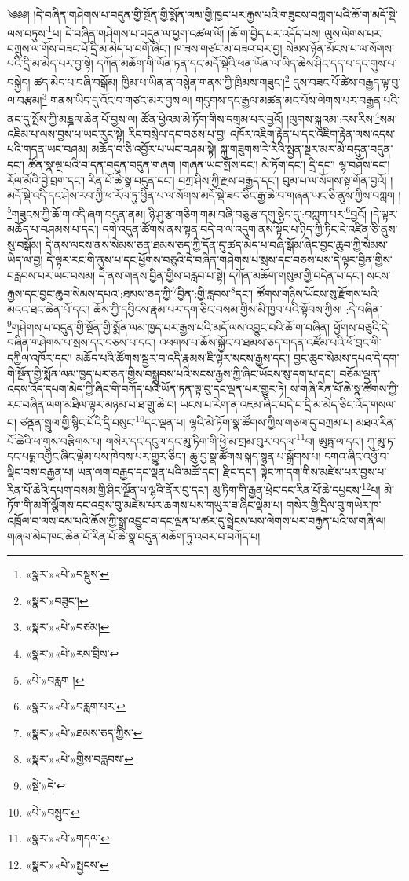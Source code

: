 ༄༅༅། །དེ་བཞིན་གཤེགས་པ་བདུན་གྱི་སྔོན་གྱི་སྨོན་ལམ་གྱི་ཁྱད་པར་རྒྱས་པའི་གཟུངས་བཀླག་པའི་ཆོ་ག་མདོ་སྡེ་ལས་བཏུས་\footnote{«སྣར་»«པེ་»བསྡུས་}པ། དེ་བཞིན་གཤེགས་པ་བདུན་ལ་ཕྱག་འཚལ་ལོ། །ཆོ་ག་བྱེད་པར་འདོད་པས། ལུས་ལེགས་པར་བཀྲུས་ལ་གོས་བཟང་པོ་དྲི་མ་མེད་པ་བགོ་ཞིང་། ཁ་ཟས་གཙང་མ་བཟའ་བར་བྱ། སེམས་ཉོན་མོངས་པ་ལ་སོགས་པའི་དྲི་མ་མེད་པར་བྱ་སྟེ། དཀོན་མཆོག་གི་ཡོན་ཏན་དང་མདོ་སྡེའི་ཕན་ཡོན་ལ་ཡིད་ཆེས་ཤིང་དད་པ་དང་གུས་པ་བསྐྱེད། ཚད་མེད་པ་བཞི་བསྒོམ། ཁྱིམ་པ་ཡིན་ན་བསྙེན་གནས་ཀྱི་ཁྲིམས་གཟུང་།\footnote{«སྣར་»བཟུང་།} དུས་བཟང་པོ་ཚེས་བརྒྱད་ལྟ་བུ་ལ་བརྩམ།\footnote{«སྣར་»«པེ་»བཙམ།} གནས་ཡིད་དུ་འོང་བ་གཙང་མར་བྱས་ལ། གདུགས་དང་རྒྱལ་མཚན་མང་པོས་ལེགས་པར་བརྒྱན་པའི་ནང་དུ་སྤོས་ཀྱི་མཎྜལ་ཆེན་པོ་བྱས་ལ། ཚོན་ཕྱེའམ་མེ་ཏོག་གིས་དགྲམ་པར་བྱའོ། །ལུགས་སྐུའམ་:རས་རིས་\footnote{«སྣར་»«པེ་»རས་བྲིས་}སམ་འཇིམ་པ་ལས་བྱས་པ་ཡང་རུང་སྟེ། རིང་བསྲེལ་དང་བཅས་པ་བྱ། འཁོར་འཇིག་རྟེན་པ་དང་འཇིག་རྟེན་ལས་འདས་པའི་གདན་ཡང་བཤམ། མཆོད་བ་ཅི་འབྱོར་པ་ཡང་བཤམ་སྟེ། སྐུ་གཟུགས་རེ་རེའི་སྤྱན་སྔར་མར་མེ་བདུན་བདུན་དང་། ཚོན་སྣ་ལྔ་པའི་བ་དན་བདུན་བདུན་གཞག །གཞན་ཡང་སྤོས་དང་། མེ་ཏོག་དང་། དྲི་དང་། ལྷ་བཤོས་དང་། རོལ་མོའི་བྱེ་བྲག་དང་། རིན་པོ་ཆེ་སྣ་བདུན་དང་། བཀྲ་ཤིས་ཀྱི་རྫས་བརྒྱད་དང་། བུམ་པ་ལ་སོགས་སྟ་གོན་བྱའོ། །མདོ་སྡེ་འདི་དང་ཤེས་རབ་ཀྱི་ཕ་རོལ་ཏུ་ཕྱིན་པ་ལ་སོགས་མདོ་སྡེ་ཟབ་ཅིང་རྒྱ་ཆེ་བ་གཞན་ཡང་ཅི་ནུས་ཀྱིས་བཀླག །\footnote{«པེ་»བརླག །}གཟུངས་ཀྱི་ཆོ་ག་འདི་ཞག་བདུན་ནམ། ཉི་ཤུ་རྩ་གཅིག་གམ་བཞི་བཅུ་རྩ་དགུ་སྙེད་དུ་:བཀླག་པར་\footnote{«སྣར་»«པེ་»བརླག་པར་}བྱའོ། །དེ་ལྟར་མཆོད་པ་བཤམས་པ་དང་། དགེ་འདུན་ཚོགས་ནས་སྟན་བདེ་བ་ལ་འདུག་ནས་སྟོང་པ་ཉིད་ཀྱི་ཏིང་ངེ་འཛིན་ཅི་ནུས་སུ་བསྒོམ། དེ་ནས་ལངས་ནས་སེམས་ཅན་ཐམས་ཅད་ཀྱི་དོན་དུ་ཚད་མེད་པ་བཞི་སྒོམ་ཞིང་བྱང་ཆུབ་ཀྱི་སེམས་ཡིད་ལ་བྱ། དེ་ལྟར་རང་གི་ནུས་པ་དང་ཕྱོགས་བཅུའི་དེ་བཞིན་གཤེགས་པ་སྲས་དང་བཅས་པས་དེ་ལྟར་བྱིན་གྱིས་བརླབས་པར་ཡང་བསམ། དེ་ནས་གནས་བྱིན་གྱིས་བརླབ་པ་སྟེ། དཀོན་མཆོག་གསུམ་གྱི་བདེན་པ་དང་། སངས་རྒྱས་དང་བྱང་ཆུབ་སེམས་དཔའ་:ཐམས་ཅད་ཀྱི་\footnote{«སྣར་»«པེ་»ཐམས་ཅད་ཀྱིས་}བྱིན་:གྱི་རླབས་\footnote{«སྣར་»«པེ་»གྱིས་བརླབས་}དང་། ཚོགས་གཉིས་ཡོངས་སུ་རྫོགས་པའི་མངའ་ཐང་ཆེན་པོ་དང་། ཆོས་ཀྱི་དབྱིངས་རྣམ་པར་དག་ཅིང་བསམ་གྱིས་མི་ཁྱབ་པའི་སྟོབས་ཀྱིས། :དེ་བཞིན་\footnote{«སྡེ་»དེ་}གཤེགས་པ་བདུན་གྱི་སྔོན་གྱི་སྨོན་ལམ་ཁྱད་པར་རྒྱས་པའི་མདོ་ལས་འབྱུང་བའི་ཆོ་ག་བཞིན། ཕྱོགས་བཅུའི་དེ་བཞིན་གཤེགས་པ་སྲས་དང་བཅས་པ་དང་། འཕགས་པ་ཆོས་སྐྱོང་བ་ཐམས་ཅད་གདན་འཛོམ་པའི་ཕོ་བྲང་གི་དཀྱིལ་འཁོར་དང་། མཆོད་པའི་ཚོགས་སྦྱར་བ་འདི་རྣམས་ཇི་ལྟར་སངས་རྒྱས་དང་། བྱང་ཆུབ་སེམས་དཔའ་དེ་དག་གི་སྔོན་གྱི་སྨོན་ལམ་ཁྱད་པར་ཅན་གྱིས་བསྒྲུབས་པའི་སངས་རྒྱས་ཀྱི་ཞིང་ཡོངས་སུ་དག་པ་དང་། བཅོམ་ལྡན་འདས་འོད་དཔག་མེད་ཀྱི་ཞིང་གི་བཀོད་པའི་ཡོན་ཏན་ལྟ་བུ་དང་ལྡན་པར་གྱུར་ཏེ། ས་གཞི་རིན་པོ་ཆེ་སྣ་ཚོགས་ཀྱི་རང་བཞིན་ལག་མཐིལ་ལྟར་མཉམ་པ་ཐ་གྲུ་ཆེ་བ། ཡངས་པ་རེག་ན་འཇམ་ཞིང་བདེ་བ་དྲི་མ་མེད་ཅིང་འོད་གསལ་བ། ཙནྡན་སྦྲུལ་གྱི་སྙིང་པོའི་དྲི་བསུང་\footnote{«པེ་»བསྲུང་}དང་ལྡན་པ། ལྷའི་མེ་ཏོག་སྣ་ཚོགས་ཀྱིས་གཅལ་དུ་བཀྲམ་པ། མཐའ་རིན་པོ་ཆེའི་ཕ་གུས་བརྩིགས་པ། གསེར་དང་དངུལ་དང་མུ་ཏིག་གི་ཕྱེ་མ་གྲམ་བུར་བདལ་\footnote{«སྣར་»«པེ་»གདལ་}བ། ཨུཏྤ་ལ་དང་། ཀུ་མུ་ཏ་དང་པདྨ་འགྱིང་ཞིང་ལྡེམ་པས་ཁེབས་པར་གྱུར་ཅིང་། ཆུ་བྱ་སྣ་ཚོགས་སྐད་སྙན་པ་སྒྲོགས་པ། དགའ་ཞིང་འཕྱོ་བ་ལྡིང་བས་བརྒྱན་པ། ཡན་ལག་བརྒྱད་དང་ལྡན་པའི་མཚོ་དང་། རྫིང་དང་། ལྟེང་ཀ་དག་གིས་མཛེས་པར་བྱས་པ་རིན་པོ་ཆེའི་དཔག་བསམ་གྱི་ཤིང་ལྗོན་པ་ལྷའི་ནོར་བུ་དང་། མུ་ཏིག་གི་རྒྱན་ཕྲེང་དང་རིན་པོ་ཆེ་དཔྱངས་\footnote{«སྣར་»«པེ་»སྤྱངས་}པ། མེ་ཏོག་གི་མགོ་ལྕོགས་དང་འབྲས་བུ་མཛེས་པར་ཆགས་པས་གཡུར་ཟ་ཞིང་ལྡེམ་པ། གསེར་གྱི་དྲིལ་བུ་གཡེར་ཁ་འཁྲོལ་བ་ལས་དམ་པའི་ཆོས་ཀྱི་སྒྲ་འབྱུང་བ་དང་ལྡན་པ་ཚར་དུ་སྦྲེངས་པས་ལེགས་པར་བརྒྱན་པའི་ས་གཞི་ལ། གཞལ་མེད་ཁང་ཆེན་པོ་རིན་པོ་ཆེ་སྣ་བདུན་མཆོག་ཏུ་འབར་བ་བཀོད་པ། 